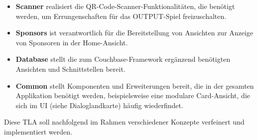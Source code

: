 \begin{itemize}
    \item \textbf{Scanner} realisiert die QR-Code-Scanner-Funktionalitäten, die benötigt werden, um Errungenschaften für das OUTPUT-Spiel freizuschalten.
    \item \textbf{Sponsors} ist verantwortlich für die Bereitstellung von Ansichten zur Anzeige von Sponsoren in der Home-Ansicht.
    \item \textbf{Database} stellt die zum Couchbase-Framework ergänzend benötigten Ansichten und Schnittstellen bereit.
    \item \textbf{Common} stellt Komponenten und Erweiterungen bereit, die in der gesamten Applikation benötigt werden, beispielsweise eine modulare Card-Ansicht, die sich im UI (siehe Dialoglandkarte) häufig wiederfindet.
\end{itemize}

\noindent Diese TLA soll nachfolgend im Rahmen verschiedener Konzepte verfeinert und implementiert werden.
